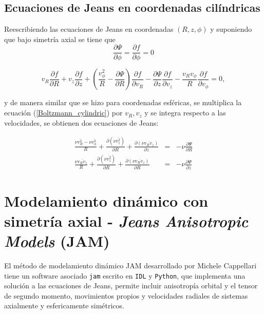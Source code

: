 \subsection{Ecuaciones de Jeans en coordenadas cilíndricas }

Reescribiendo las ecuaciones de Jeans en coordenadas $(R, z, \phi)$ y suponiendo que bajo simetría axial se tiene que 
$$ \frac{\partial \Psi}{\partial \phi} =  \frac{\partial f }{\partial \phi} = 0 $$

\begin{equation}
\label{Boltzmann_cylindric}
v_R \frac{\partial f}{\partial R} +  v_z \frac{\partial f}{\partial z} + \left ( \frac{v_{\phi}^2}{R} - \frac{\partial \Psi}{\partial R}  \right ) \frac{\partial f}{\partial v_R} - \frac{\partial \Psi}{\partial z} \frac{\partial f}{\partial v_z} - \frac{v_R v_{\phi} }{ R} \frac{\partial f}{\partial v_{\phi}} = 0,  
\end{equation}

y de manera similar que se hizo para coordenadas esféricas, se multiplica la ecuación (\ref{Boltzmann_cylindric}) por $v_R, v_z$ y se integra respecto a las velocidades, se obtienen dos ecuaciones de Jeans:

\begin{eqnarray}
\label{Jeans_eq_cylindric}
\frac{ \nu \overline{v_R^2} - \nu \overline{v_{\phi}^2} }{R } + \frac{\partial (\nu \overline{v_z^2})}{\partial R} + \frac{\partial (\nu \overline{v_R v_z}) }{\partial z} &=& -\nu \frac{\partial \Psi}{\partial R} \\
\frac{ \nu \overline{v_R v_z}  }{R } + \frac{\partial (\nu \overline{v_z^2})}{\partial R} + \frac{\partial (\nu \overline{v_R v_z}) }{\partial R} &=& -\nu \frac{\partial \Psi}{\partial z}
\end{eqnarray}

\section{Modelamiento dinámico con simetría axial - \emph{Jeans Anisotropic Models} (JAM)}

El método de modelamiento dinámico JAM desarrollado por Michele Cappellari \cite{2008MNRAS.390_71C} tiene un software asociado \verb+jam+ escrito en \verb+IDL+ y \verb+Python+, que implementa una solución a las ecuaciones de Jeans, permite incluir anisotropía orbital y el tensor de segundo momento,  movimientos propios y velocidades radiales de sistemas axialmente y esfericamente simétricos.\\ 

